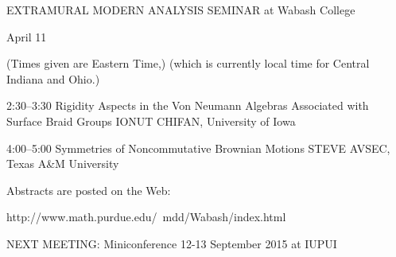  EXTRAMURAL MODERN ANALYSIS
            SEMINAR
       at Wabash College

           April 11

(Times given are Eastern Time,)
(which is currently local time for Central Indiana and Ohio.)


2:30--3:30   Rigidity Aspects in the Von Neumann Algebras Associated with 
Surface Braid Groups
              IONUT CHIFAN,  University of Iowa

4:00--5:00  Symmetries of Noncommutative Brownian Motions
               STEVE AVSEC, Texas A&M University
 

Abstracts are posted on the Web:

 http://www.math.purdue.edu/~mdd/Wabash/index.html

NEXT MEETING: Miniconference 12-13 September 2015 at IUPUI
